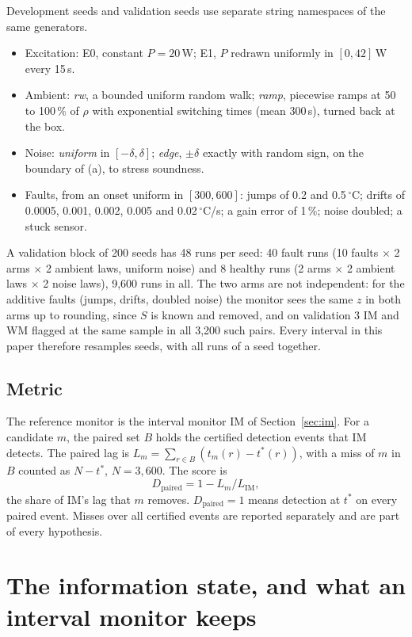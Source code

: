 \documentclass[11pt,a4paper]{article}
\newcommand{\degC}{\ensuremath{{}^\circ}C}
\newcommand{\Dp}{D_{\mathrm{paired}}}
\newcommand{\tstar}{t^{\ast}}
\begin{document}
Development seeds and validation seeds use separate string namespaces of the same generators.
\begin{itemize}
\item Excitation: E0, constant $P = 20$\,W; E1, $P$ redrawn uniformly in $[0,42]$\,W every 15\,s.
\item Ambient: \emph{rw}, a bounded uniform random walk; \emph{ramp}, piecewise ramps at 50 to 100\,\% of $\rho$ with
  exponential switching times (mean 300\,s), turned back at the box.
\item Noise: \emph{uniform} in $[-\delta,\delta]$; \emph{edge}, $\pm\delta$ exactly with random sign, on the boundary of
  (a), to stress soundness.
\item Faults, from an onset uniform in $[300,600]$: jumps of 0.2 and 0.5\,\degC; drifts of 0.0005, 0.001, 0.002, 0.005
  and 0.02\,\degC/s; a gain error of 1\,\%; noise doubled; a stuck sensor.
\end{itemize}
A validation block of 200 seeds has 48 runs per seed: 40 fault runs (10 faults $\times$ 2 arms $\times$ 2 ambient laws,
uniform noise) and 8 healthy runs (2 arms $\times$ 2 ambient laws $\times$ 2 noise laws), 9,600 runs in all. The two
arms are not independent: for the additive faults (jumps, drifts, doubled noise) the monitor sees the same $z$ in both
arms up to rounding, since $S$ is known and removed, and on validation 3 IM and WM flagged at the same sample in all
3,200 such pairs. Every interval in this paper therefore resamples seeds, with all runs of a seed together.

\subsection{Metric}

The reference monitor is the interval monitor IM of Section~\ref{sec:im}. For a candidate $m$, the paired set $B$ holds
the certified detection events that IM detects. The paired lag is $L_m = \sum_{r\in B}(t_m(r)-\tstar(r))$, with a miss
of $m$ in $B$ counted as $N-\tstar$, $N = 3{,}600$. The score is
\[
\Dp = 1 - L_m/L_{\mathrm{IM}},
\]
the share of IM's lag that $m$ removes. $\Dp = 1$ means detection at $\tstar$ on every paired event. Misses over all
certified events are reported separately and are part of every hypothesis.

\section{The information state, and what an interval monitor keeps}
\end{document}
